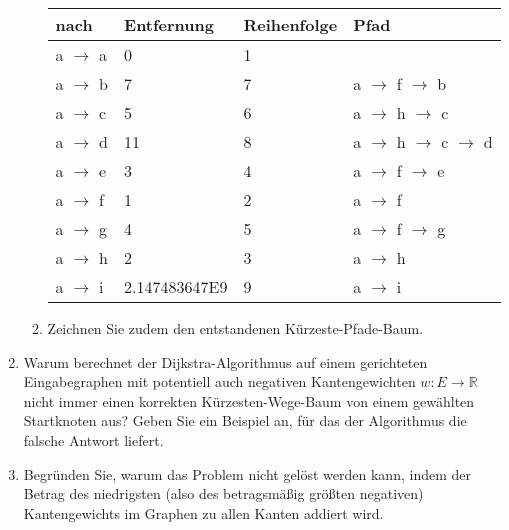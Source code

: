 \documentclass{lehramt-informatik-aufgabe}
\begin{document}
\begin{enumerate}
\begin{enumerate}
\begin{liAntwort}
\begin{tabular}{llll}
\bf{nach} & \bf{Entfernung} & \bf{Reihenfolge} & \bf{Pfad} \\
\hline
a  $\rightarrow$  a & 0 & 1 &   \\
a  $\rightarrow$  b & 7 & 7 & a $\rightarrow$ f $\rightarrow$ b \\
a  $\rightarrow$  c & 5 & 6 & a $\rightarrow$ h $\rightarrow$ c \\
a  $\rightarrow$  d & 11 & 8 & a $\rightarrow$ h $\rightarrow$ c $\rightarrow$ d \\
a  $\rightarrow$  e & 3 & 4 & a $\rightarrow$ f $\rightarrow$ e \\
a  $\rightarrow$  f & 1 & 2 & a $\rightarrow$ f \\
a  $\rightarrow$  g & 4 & 5 & a $\rightarrow$ f $\rightarrow$ g \\
a  $\rightarrow$  h & 2 & 3 & a $\rightarrow$ h \\
a  $\rightarrow$  i & 2.147483647E9 & 9 & a $\rightarrow$ i \\
\end{tabular}
\end{liAntwort}


\item Zeichnen Sie zudem den entstandenen Kürzeste-Pfade-Baum.

\end{enumerate}


\item Warum berechnet der Dijkstra-Algorithmus auf einem gerichteten
Eingabegraphen mit potentiell auch negativen Kantengewichten $w : E
\rightarrow \mathbb{R}$ nicht immer einen korrekten Kürzesten-Wege-Baum
von einem gewählten Startknoten aus? Geben Sie ein Beispiel an, für das
der Algorithmus die falsche Antwort liefert.


\item Begründen Sie, warum das Problem nicht gelöst werden kann, indem
der Betrag des niedrigsten (also des betragsmäßig größten negativen)
Kantengewichts im Graphen zu allen Kanten addiert wird.

\end{enumerate}
\end{document}

